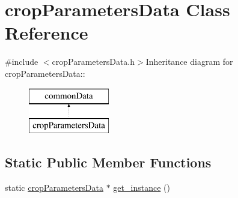 \hypertarget{classcrop_parameters_data}{
\section{cropParametersData Class Reference}
\label{classcrop_parameters_data}
}


{\ttfamily \#include $<$cropParametersData.h$>$}Inheritance diagram for cropParametersData::\begin{figure}[H]
\begin{center}
\leavevmode
\includegraphics[height=2cm]{classcrop_parameters_data}
\end{center}
\end{figure}
\subsection*{Static Public Member Functions}
\begin{DoxyCompactItemize}
\item 
static \hyperlink{classcrop_parameters_data}{cropParametersData} $\ast$ \hyperlink{classcrop_parameters_data_aafb0367069f7e133090adc2da39bf903}{get\_\-instance} ()
\end{DoxyCompactItemize}
